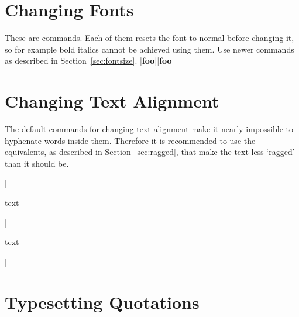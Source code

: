 \section{Changing Fonts}

These are  commands. Each of them resets the font to normal
before changing it, so for example bold italics cannot be achieved using them.
Use newer commands as described in Section~\ref{sec:fontsize}.
\chto|{\bf foo}||{\bfseries foo}|

\section{Changing Text Alignment}

The default  commands for changing text alignment make it
nearly impossible to hyphenate words inside them. Therefore it is recommended
to use the  equivalents, as described in
Section~\ref{sec:ragged}, that make the text less \enquote*{ragged} than it
should be.
\begin{chktexignore}  
\chto|\begin{center}
  text
\end{center}|
|\usepackage{ragged2e}
\begin{Center}
  text
\end{Center}|
\end{chktexignore}

\section{Typesetting Quotations}

